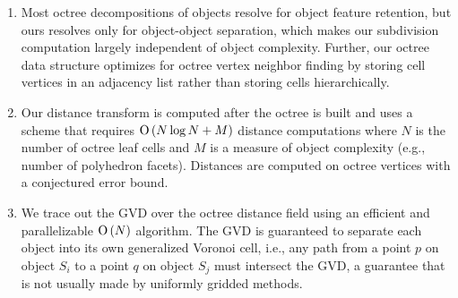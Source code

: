 \documentclass{egpubl}
\begin{document}
\begin{enumerate}
\item Most octree decompositions of objects resolve for object feature retention, but ours resolves only for object-object separation, which makes our subdivision computation largely independent of object complexity.  Further, our octree data structure optimizes for octree vertex neighbor finding
by storing cell vertices in an adjacency list rather than storing cells hierarchically.
\item Our distance transform is computed after the octree is built and uses a scheme that requires $\operatorname{O}\left(N\log{N}+M\right)$ distance computations where $N$ is the number of octree leaf cells and $M$ is a measure of object complexity (e.g., number of polyhedron facets).  Distances are computed on octree vertices with a conjectured error bound.%
\item We trace out the GVD over the octree distance field using an efficient and parallelizable $\operatorname{O}\left(N\right)$ algorithm.  The GVD is guaranteed to separate each object into its own generalized Voronoi cell, i.e., any path from a point $p$ on object $S_i$ to a point $q$ on object $S_j$ must intersect the GVD, a guarantee that is not usually made by uniformly gridded methods.
\end{enumerate}
\end{document}
